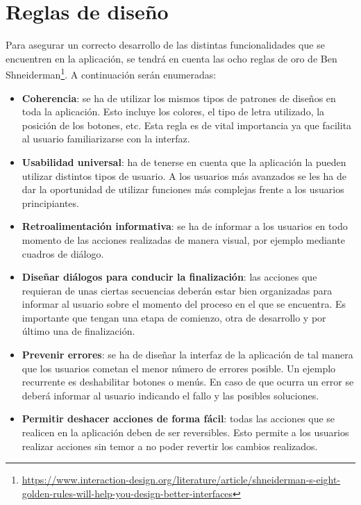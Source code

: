 \section{Reglas de diseño}
\label{cap4:sec:reglas}
Para asegurar un correcto desarrollo de las distintas funcionalidades que se encuentren en la aplicación, se tendrá en cuenta las ocho reglas de oro de Ben Shneiderman\footnote{\url{https://www.interaction-design.org/literature/article/shneiderman-s-eight-golden-rules-will-help-you-design-better-interfaces}}. A continuación serán enumeradas: 


\begin{itemize}
	
	\item \textbf{Coherencia}: se ha de utilizar los mismos tipos de patrones de diseños en toda la aplicación. Esto incluye los colores, el tipo de letra utilizado, la posición de los botones, etc. Esta regla es de vital importancia ya que facilita al usuario familiarizarse con la interfaz.
	
	\item \textbf{Usabilidad universal}: ha de tenerse en cuenta que la aplicación la pueden utilizar distintos tipos de usuario. A los usuarios más avanzados se les ha de dar la oportunidad de utilizar funciones más complejas frente a los usuarios principiantes. 
	
	\item \textbf{Retroalimentación informativa}: se ha de informar a los usuarios en todo momento de las acciones realizadas de manera visual, por ejemplo mediante cuadros de diálogo.
	
	\item \textbf{Diseñar diálogos para conducir la finalización}: las acciones que requieran de unas ciertas secuencias deberán estar bien organizadas para informar al usuario sobre el momento del proceso en el que se encuentra. Es importante que tengan una etapa de comienzo, otra de desarrollo y por último una de finalización.
	\item \textbf{Prevenir errores}: se ha de diseñar la interfaz de la aplicación de tal manera que los usuarios cometan el menor número de errores posible. Un ejemplo recurrente es deshabilitar botones o menús. En caso de que ocurra un error se deberá informar al usuario indicando el fallo y las posibles soluciones. 
	
	\item \textbf{Permitir deshacer acciones de forma fácil}: todas las acciones que se realicen en la aplicación deben de ser reversibles. Esto permite a los usuarios realizar acciones sin temor a no poder revertir los cambios realizados.
	

\end{itemize}
